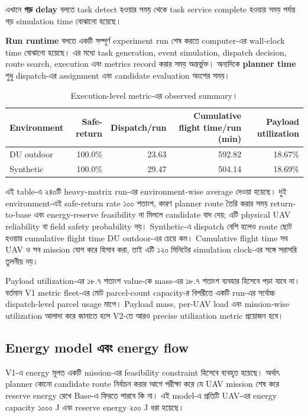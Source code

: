 \documentclass[10pt,a4paper]{article}
\begin{document}
এখানে \textbf{গড় delay} বলতে task detect হওয়ার সময় থেকে task service complete হওয়ার সময় পর্যন্ত গড় simulation time বোঝানো হয়েছে।

\textbf{Run runtime} বলতে একটি সম্পূর্ণ experiment run শেষ করতে computer-এর wall-clock time বোঝানো হয়েছে। এর মধ্যে task generation, event simulation, dispatch decision, route search, execution এবং metrics record করার সময় অন্তর্ভুক্ত। অন্যদিকে \textbf{planner time} শুধু dispatch-এর assignment এবং candidate evaluation অংশের সময়।

\begin{table}[htbp]
\centering
\caption{Execution-level metric-এর observed summary।}
\label{tab:execution-summary-bn}
\scriptsize
{}
\begin{tabular}{@{}lrrrr@{}}
\toprule
Environment & Safe-return & Dispatch/run & Cumulative flight time/run (min) & Payload utilization \\
\midrule
DU outdoor & 100.0\% & 23.63 & 592.82 & 18.67\% \\
Synthetic & 100.0\% & 29.47 & 504.14 & 18.69\% \\
\bottomrule
\end{tabular}
\end{table}

এই table-এ ২৪০টি heavy-matrix run-এর environment-wise average দেওয়া হয়েছে।
দুই environment-এই safe-return rate ১০০ শতাংশ, কারণ planner route তৈরি করার
সময় return-to-base এবং energy-reserve feasibility না মিললে candidate বাদ দেয়;
এটি physical UAV reliability বা field safety probability নয়। Synthetic-এ
dispatch বেশি হলেও route ছোট হওয়ায় cumulative flight time DU outdoor-এর চেয়ে
কম। Cumulative flight time সব UAV ও সব mission যোগ করে হিসাব করা, তাই এটি
১২০ মিনিটের simulation clock-এর সঙ্গে সরাসরি তুলনীয় নয়।

Payload utilization-এর ১৮.৭ শতাংশ value-কে mass-এর ১৮.৭ শতাংশ ব্যবহার হিসেবে
পড়া যাবে না। বর্তমান V1 metric fleet-এর মোট parcel-count capacity-র বিপরীতে
একটি run-এর সর্বোচ্চ dispatch-level parcel usage মাপে। Payload mass, per-UAV
load এবং mission-wise utilization আলাদা করে জানাতে হলে V2-তে আরও precise
utilization metric প্রয়োজন হবে।

\subsection{Energy model এবং energy flow}

V1-এ energy মূলত একটি mission-এর feasibility constraint হিসেবে ব্যবহৃত হয়েছে। অর্থাৎ planner কোনো candidate route নির্বাচন করার আগে পরীক্ষা করে যে UAV mission শেষ করে reserve energy রেখে Base-এ ফিরতে পারবে কি না। এই model-এ প্রতিটি UAV-এর energy capacity ১০০০ J এবং reserve energy ২০০ J ধরা হয়েছে।
\end{document}
